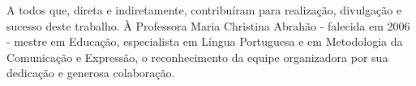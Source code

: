 %

\begin{Dedicatoria}
A todos que, direta e indiretamente, contribuíram para realização, divulgação e sucesso deste trabalho. À Professora Maria Christina Abrahão - falecida em 2006 - mestre em Educação, especialista em Língua Portuguesa e em Metodologia da Comunicação e Expressão, o reconhecimento da equipe organizadora por sua dedicação e generosa colaboração.
\end{Dedicatoria}

